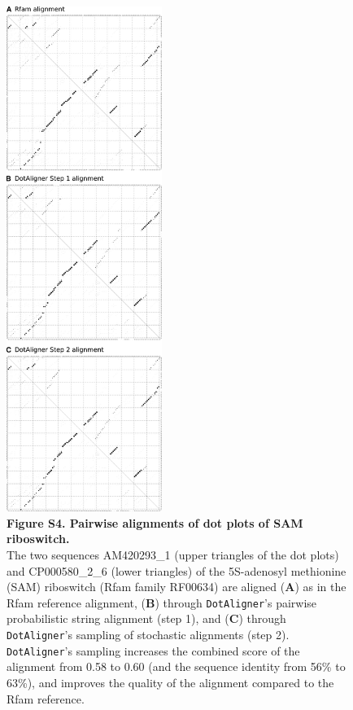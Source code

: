 \documentclass{bmcart}
\newcommand\dotaligner{\texttt{DotAligner}}
\begin{document}
\begin{figure}
 \includegraphics[width=0.45\textwidth]{SF4}
 \caption*{ \textbf{ Figure S4. Pairwise alignments of dot plots of SAM riboswitch. }\\
 The two sequences AM420293\_1 (upper triangles of the dot plots) and CP000580\_2\_6 (lower triangles) of the 5S-adenosyl methionine (SAM) riboswitch (Rfam family RF00634) are aligned (\textbf{A}) as in the Rfam reference alignment, (\textbf{B}) through \dotaligner's pairwise probabilistic string alignment (step 1), and (\textbf{C}) through \dotaligner's sampling of stochastic alignments (step 2). \dotaligner's sampling increases the combined score of the alignment from 0.58 to 0.60 (and the sequence identity from 56\% to 63\%), and improves the quality of the alignment compared to the Rfam reference.
}
\end{figure}
\end{document}
